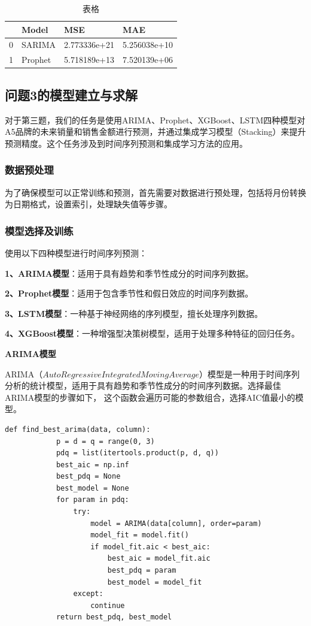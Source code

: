 \documentclass[a4paper]{article}
\begin{document}
	\begin{table}[H]

		\centering
	
		\begin{tabularx}{\textwidth}{|X|X|X|X|} %
	
		\hline
	
			&Model          & MSE        &   MAE\\
		\hline
		0   &SARIMA  &2.773336e+21  &5.256038e+10\\
		\hline
		1  &Prophet  &5.718189e+13 & 7.520139e+06\\
	
		\hline
		\end{tabularx}
	
		\caption{表格}
	
	\end{table}

	\subsection{问题3的模型建立与求解}
	对于第三题，我们的任务是使用ARIMA、Prophet、XGBoost、LSTM四种模型对A5品牌的未来销量和销售金额进行预测，并通过集成学习模型（Stacking）来提升预测精度。这个任务涉及到时间序列预测和集成学习方法的应用。
	\subsubsection{数据预处理}
	为了确保模型可以正常训练和预测，首先需要对数据进行预处理，包括将月份转换为日期格式，设置索引，处理缺失值等步骤。

	\subsubsection{模型选择及训练}
	使用以下四种模型进行时间序列预测：

	\textbf{1、ARIMA模型}：适用于具有趋势和季节性成分的时间序列数据。

	\textbf{2、Prophet模型}：适用于包含季节性和假日效应的时间序列数据。

	\textbf{3、LSTM模型}：一种基于神经网络的序列模型，擅长处理序列数据。

	\textbf{4、XGBoost模型}：一种增强型决策树模型，适用于处理多种特征的回归任务。

	\textbf{ARIMA模型}

	ARIMA（$AutoRegressive Integrated Moving Average$）模型是一种用于时间序列分析的统计模型，适用于具有趋势和季节性成分的时间序列数据。选择最佳ARIMA模型的步骤如下，
	这个函数会遍历可能的参数组合，选择AIC值最小的模型。
	\begin{lstlisting}[caption={Python Example}, label={lst:example}]
		def find_best_arima(data, column):
			p = d = q = range(0, 3)
			pdq = list(itertools.product(p, d, q))
			best_aic = np.inf
			best_pdq = None
			best_model = None
			for param in pdq:
				try:
					model = ARIMA(data[column], order=param)
					model_fit = model.fit()
					if model_fit.aic < best_aic:
						best_aic = model_fit.aic
						best_pdq = param
						best_model = model_fit
				except:
					continue
			return best_pdq, best_model
	\end{lstlisting}
	
\end{document}

